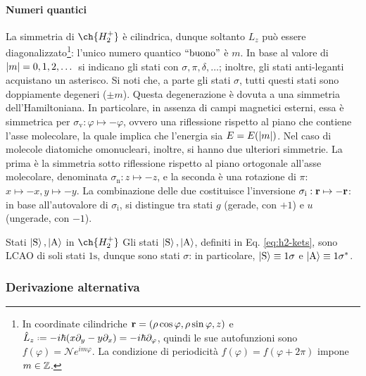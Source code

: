 \paragraph{Numeri quantici}

La simmetria di $ \ch{H_2^+} $ è cilindrica, dunque soltanto $ L_z $ può essere diagonalizzato\footnote{In coordinate cilindriche $ \mathbf{r} = (\rho \cos \varphi, \rho \sin \varphi, z) $ e $ \hat{L}_z \defeq -i\hbar (x \pa_y - y \pa_x) = -i \hbar \pa_\varphi $, quindi le sue autofunzioni sono $ f(\varphi) = \mathcal{N} e^{i m \varphi} $. La condizione di periodicità $ f(\varphi) = f(\varphi + 2\pi) $ impone $ m \in \mathbb{Z} $.}: l'unico numero quantico $ ``\text{buono}" $ è $ m $. In base al valore di $ \left\lvert m\right\rvert = 0, 1, 2, \dots $ si indicano gli stati con $ \sigma, \pi, \delta, \dots $; inoltre, gli stati anti-leganti acquistano un asterisco. Si noti che, a parte gli stati $ \sigma $, tutti questi stati sono doppiamente degeneri ($ \pm m $). Questa degenerazione è dovuta a una simmetria dell'Hamiltoniana. In particolare, in assenza di campi magnetici esterni, essa è simmetrica per $ \sigma_\text{v} : \varphi \mapsto -\varphi $, ovvero una riflessione rispetto al piano che contiene l'asse molecolare, la quale implica che l'energia sia $ E = E(\left\lvert m\right\rvert) $. Nel caso di molecole diatomiche omonucleari, inoltre, si hanno due ulteriori simmetrie. La prima è la simmetria sotto riflessione rispetto al piano ortogonale all'asse molecolare, denominata $\sigma_\text{n}: z \mapsto -z$, e la seconda è una rotazione di $\pi$: $x \mapsto -x, y \mapsto -y$. La combinazione delle due costituisce l'inversione $ \sigma_\text{i} : \mathbf{r} \mapsto -\mathbf{r}$: in base all'autovalore di $ \sigma_\text{i} $, si distingue tra stati $ g $ (gerade, con $ +1 $) e $ u $ (ungerade, con $ -1 $).

\begin{example}{Stati $ \ket{\text{S}},\ket{\text{A}} $ in $ \ch{H_2^+} $}{}
	Gli stati $ \ket{\text{S}},\ket{\text{A}} $, definiti in Eq. \ref{eq:h2-kets}, sono LCAO di soli stati $ \text{1s} $, dunque sono stati $ \sigma $: in particolare, $ \ket{\text{S}} \equiv 1\sigma $ e $ \ket{\text{A}} \equiv 1\sigma^* $.
\end{example}

\subsubsection{Derivazione alternativa}

